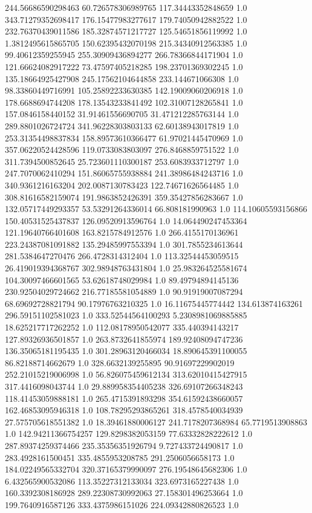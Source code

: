 244.56686590298463	60.726578306989765	117.34443352848659	1.0
343.71279352698417	176.15477983277617	179.74050942882522	1.0
232.76370439011586	185.32874571217727	125.54651856119992	1.0
1.3812495615865705	150.62395432070198	215.34340912563385	1.0
99.40612359255945	255.30909436894277	266.78366844171904	1.0
121.66624082917222	73.47597405218285	198.23701369302245	1.0
135.18664925427908	245.17562104644858	233.144671066308	1.0
98.33860449716991	105.25892233630385	142.19009060206918	1.0
178.6688694744208	178.13543233841492	102.31007128265841	1.0
157.0846158440152	31.91461556690705	31.471212285763144	1.0
289.8801026724724	341.96228303803133	62.60138943017819	1.0
253.31354498837834	158.89573610366477	61.97021445470969	1.0
357.06220524428596	119.0733083803097	276.8468859751522	1.0
311.7394500852645	25.723601110300187	253.6083933712797	1.0
247.7070062410294	151.86065755938884	241.38986484243716	1.0
340.9361216163204	202.0087130783423	122.74671626564485	1.0
308.81616582159074	191.9863852426391	359.35427856283667	1.0
132.05717449293357	53.53291264336014	66.808181990963	1.0
114.10605593156866	150.40531525437837	126.09520913596764	1.0
14.064490247453364	121.19640766401608	163.8215784912576	1.0
266.4155170136961	223.24387081091882	135.29485997553394	1.0
301.7855234613644	281.5384647270476	266.4728314312404	1.0
113.32544453059515	26.419019394368767	302.98948763431804	1.0
25.983264525581674	104.30097466601565	53.62618748029984	1.0
89.49794894145136	230.92504029724662	216.77185581054889	1.0
90.91919007087294	68.69692728821794	90.17976763210325	1.0
16.11675445774442	134.613874163261	296.59151102581023	1.0
333.52544564100293	5.2308981069885885	18.625217717262252	1.0
112.08178950542077	335.440394143217	127.89326936501857	1.0
263.8732641855974	189.92408094747236	136.35065181195435	1.0
301.28963120466034	18.890645391100055	86.82188714662679	1.0
328.6632139255895	90.91697229902019	252.21015219006998	1.0
56.826075459612134	313.62010415427915	317.4416098043744	1.0
29.889958354405238	326.69107266348243	118.41453059888181	1.0
265.4715391893298	354.61592438660057	162.46853095946318	1.0
108.78295293865261	318.4578540034939	27.575705618551382	1.0
18.39461880006127	241.7178207368984	65.7719513908863	1.0
142.94211366754257	129.8298382053159	77.63332828222612	1.0
287.89374259374466	235.35356351926794	9.727433724490817	1.0
283.4928161500451	335.4855953208785	291.2506056658173	1.0
184.02249565332704	320.37165379990097	276.19548645682306	1.0
6.432565900532086	113.35227312133034	323.6973165227438	1.0
160.3392308186928	289.22308730992063	27.158301496253664	1.0
199.7640916587126	333.4375986151026	224.09342880826523	1.0
